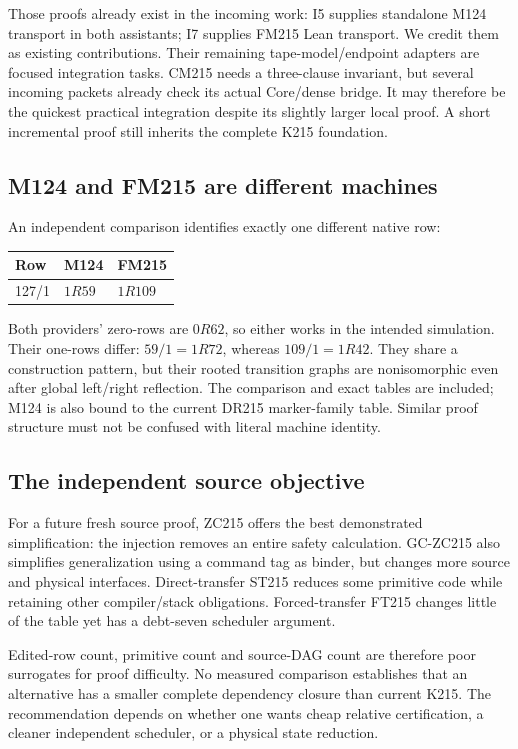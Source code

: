 \documentclass[11pt]{article}
\begin{document}
Those proofs already exist in the incoming work: I5 supplies standalone M124
transport in both assistants; I7 supplies FM215 Lean transport. We credit them
as existing contributions. Their remaining tape-model/endpoint adapters are
focused integration tasks. CM215 needs a three-clause invariant, but several
incoming packets already check its actual Core/dense bridge. It may therefore
be the quickest practical integration despite its slightly larger local proof.
A short incremental proof still inherits the complete K215 foundation.

\subsection{M124 and FM215 are different machines}

An independent comparison identifies exactly one different native row:
\begin{center}\begin{tabular}{@{}lll@{}}
\toprule Row & M124 & FM215\\\midrule
127/1 & $1R59$ & $1R109$\\\bottomrule
\end{tabular}\end{center}
Both providers' zero-rows are $0R62$, so either works in the intended simulation.
Their one-rows differ: $59/1=1R72$, whereas $109/1=1R42$. They share a construction
pattern, but their rooted transition graphs are nonisomorphic even after global
left/right reflection. The comparison and exact tables are included; M124 is
also bound to the current DR215 marker-family table. Similar proof structure
must not be confused with literal machine identity.

\subsection{The independent source objective}

For a future fresh source proof, ZC215 offers the best demonstrated simplification:
the injection removes an entire safety calculation. GC-ZC215 also simplifies
generalization using a command tag as binder, but changes more source and
physical interfaces. Direct-transfer ST215 reduces some primitive code while
retaining other compiler/stack obligations. Forced-transfer FT215 changes little
of the table yet has a debt-seven scheduler argument.

Edited-row count, primitive count and source-DAG count are therefore poor
surrogates for proof difficulty. No measured comparison establishes that an
alternative has a smaller complete dependency closure than current K215.
The recommendation depends on whether one wants cheap relative certification,
a cleaner independent scheduler, or a physical state reduction.
\end{document}
